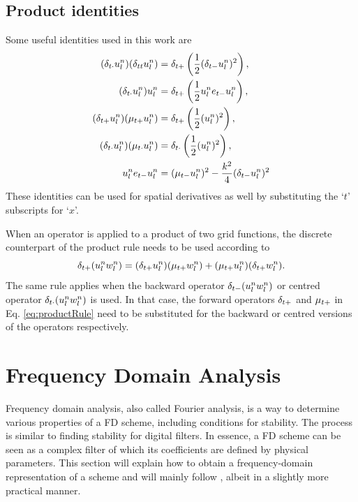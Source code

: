 \subsection{Product identities}\label{sec:prodIdentities}
Some useful identities used in this work are
\begin{subequations}
    \begin{align}
        (\delta_{t\cdot} u_l^n)(\delta_{tt} u_l^n) &= \delta_{t+} \left(\frac{1}{2}(\delta_{t-} u_l^n)^2\right),\label{eq:prodIdentity1}\\
        (\delta_{t\cdot} u_l^n)u_l^n &= \delta_{t+} \left(\frac{1}{2}u_l^n e_{t-}u_l^n\right),\label{eq:prodIdentity2}\\
        (\delta_{t+} u_l^n)(\mu_{t+} u_l^n) &= \delta_{t+} \left(\frac{1}{2}(u_l^n)^2\right),\label{eq:prodIdentity3}\\
        (\delta_{t\cdot} u_l^n)(\mu_{t\cdot}u_l^n) &= \delta_{t\cdot}\left(\frac{1}{2} (u_l^n)^2\right),\label{eq:prodIdentity4}\\
        u_l^n e_{t-}u_l^n &=  (\mu_{t-} u_l^n)^2 - \frac{k^2}{4}(\delta_{t-} u_l^n)^2\label{eq:prodIdentityEnergyStab}
    \end{align}
\end{subequations}
These identities can be used for spatial derivatives as well by substituting the `$t$' subscripts for `$x$'.

When an operator is applied to a product of two grid functions, the discrete counterpart of the product rule needs to be used according to
\begin{equation}\label{eq:productRule}
    \delta_{t+} (u_l^nw_l^n) = (\delta_{t+} u_l^n)(\mu_{t+}w_l^n) + (\mu_{t+} u_l^n)(\delta_{t+} w_l^n).
\end{equation}
The same rule applies when the backward operator $\delta_{t-}(u_l^nw_l^n)$ or centred operator $\delta_{t\cdot}(u_l^nw_l^n)$ is used. In that case, the forward operators $\delta_{t+}$ and $\mu_{t+}$ in Eq. \eqref{eq:productRule} need to be substituted for the backward or centred versions of the operators respectively. 

\section{Frequency Domain Analysis}\label{sec:stabilityAnalysis}
Frequency domain analysis, also called Fourier analysis, is a way to determine various properties of a FD scheme, including conditions for stability. The process is similar to finding stability for digital filters. In essence, a FD scheme can be seen as a complex filter of which its coefficients are defined by physical parameters. This section will explain how to obtain a frequency-domain representation of a scheme and will mainly follow \cite{theBible}, albeit in a slightly more practical manner.

